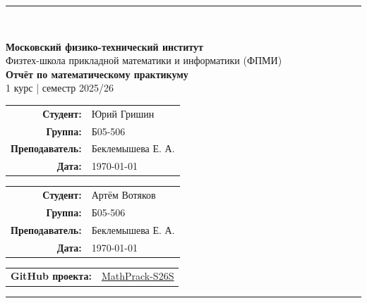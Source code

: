 
\begin{titlepage}
  \thispagestyle{empty}
  \vspace*{1cm}

  {\color{MiptBlue}\rule{\linewidth}{2pt}}\\[0.5cm]

  \begin{center}
    {\Large\bfseries Московский физико-технический институт}\\[0.2cm]
    {\large Физтех-школа прикладной математики и информатики (ФПМИ)}\\[0.8cm]

    {\huge\bfseries Отчёт по математическому практикуму}\\[0.4cm]
    {\large 1 курс \quad| семестр 2025/26}\\[1.2cm]

    \begin{tabular}{rl}
      \textbf{Студент:}     & Юрий Гришин \\[0.3cm]
      \textbf{Группа:}      & Б05-506 \\[0.3cm]
      \textbf{Преподаватель:} & Беклемышева Е. А. \\[0.3cm]
      \textbf{Дата:}        & \today \\
    \end{tabular}
        \begin{tabular}{rl}
      \textbf{Студент:}     & Артём Вотяков \\[0.3cm]
      \textbf{Группа:}      & Б05-506 \\[0.3cm]
      \textbf{Преподаватель:} & Беклемышева Е. А. \\[0.3cm]
      \textbf{Дата:}        & \today \\
    \end{tabular}

    \vspace{0.6cm}

    \begin{tabular}{rl}
      \textbf{GitHub проекта:} & \href{https://github.com/MrVotyakov/MathPrack-S26S}{MathPrack-S26S} \\
    \end{tabular}
  \end{center}

  \vfill
  {\color{MiptBlue}\rule{\linewidth}{2pt}}
\end{titlepage}
